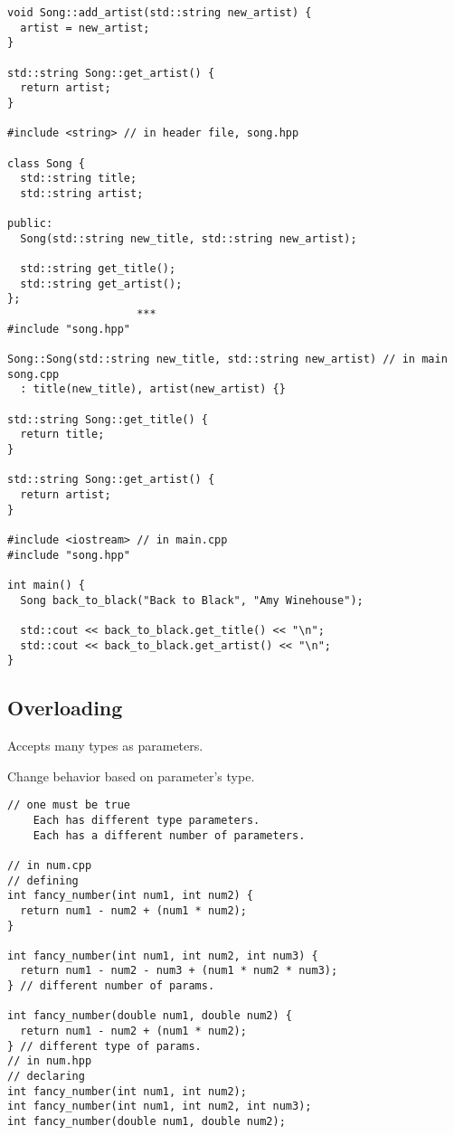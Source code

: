 \documentclass[openany]{report}
\begin{document}
\begin{verbatim}
void Song::add_artist(std::string new_artist) {
  artist = new_artist;
}

std::string Song::get_artist() {
  return artist;
}

#include <string> // in header file, song.hpp

class Song {
  std::string title;
  std::string artist;

public:
  Song(std::string new_title, std::string new_artist);

  std::string get_title();
  std::string get_artist();
};
                    ***
#include "song.hpp"

Song::Song(std::string new_title, std::string new_artist) // in main song.cpp
  : title(new_title), artist(new_artist) {}

std::string Song::get_title() {
  return title;
}

std::string Song::get_artist() {
  return artist;
}

#include <iostream> // in main.cpp
#include "song.hpp"

int main() { 
  Song back_to_black("Back to Black", "Amy Winehouse");

  std::cout << back_to_black.get_title() << "\n";
  std::cout << back_to_black.get_artist() << "\n";
}
\end{verbatim}

\subsection{Overloading}

Accepts many types as parameters.

Change behavior based on parameter's type.

\begin{verbatim}
// one must be true
    Each has different type parameters.
    Each has a different number of parameters.
    
// in num.cpp 
// defining
int fancy_number(int num1, int num2) {
  return num1 - num2 + (num1 * num2);
}

int fancy_number(int num1, int num2, int num3) {
  return num1 - num2 - num3 + (num1 * num2 * num3);
} // different number of params.

int fancy_number(double num1, double num2) {
  return num1 - num2 + (num1 * num2);
} // different type of params.
// in num.hpp
// declaring
int fancy_number(int num1, int num2);
int fancy_number(int num1, int num2, int num3);
int fancy_number(double num1, double num2);

\end{verbatim}
\end{document}
